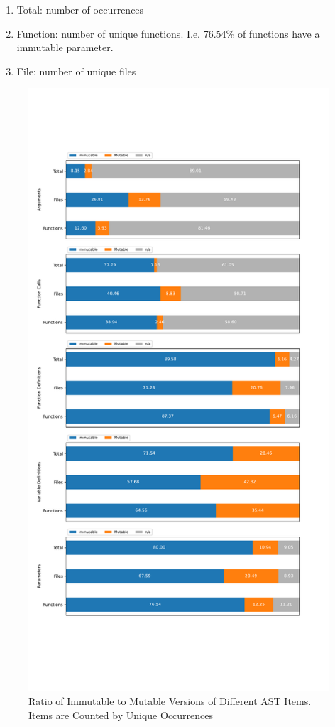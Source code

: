 \documentclass{book}
\theoremstyle{definition}
\begin{document}
\begin{enumerate}
  \item Total: number of occurrences
  \item Function: number of unique functions. I.e. 76.54\% of functions have a immutable parameter.
  \item File: number of unique files
\end{enumerate}


\begin{figure}[h]
	\centering
	\includegraphics[width=0.9\linewidth, clip, trim={0.5cm 6cm 0.5cm 6cm}]{../mutability_by_category.pdf}
	\caption{Ratio of Immutable to Mutable Versions of Different AST Items. Items are Counted by Unique Occurrences}
	\label{fig:mutabillity_by_category}
\end{figure}
\end{document}
